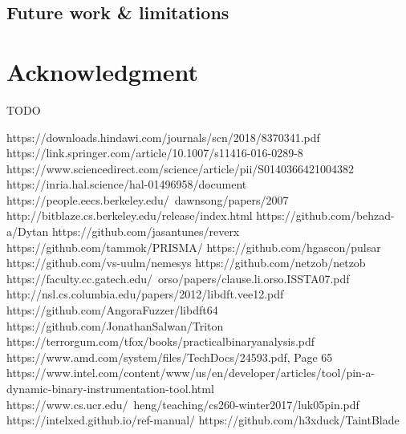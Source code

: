 \documentclass[conference]{IEEEtran}
\begin{document}
\subsection{Future work \& limitations}

\section*{Acknowledgment}
TODO

\begin{thebibliography}{00}
     https://downloads.hindawi.com/journals/scn/2018/8370341.pdf
     https://link.springer.com/article/10.1007/s11416-016-0289-8
     https://www.sciencedirect.com/science/article/pii/S0140366421004382
     https://inria.hal.science/hal-01496958/document
     https://people.eecs.berkeley.edu/~dawnsong/papers/2007%
     http://bitblaze.cs.berkeley.edu/release/index.html
     https://github.com/behzad-a/Dytan
     https://github.com/jasantunes/reverx
     https://github.com/tammok/PRISMA/
     https://github.com/hgascon/pulsar
     https://github.com/vs-uulm/nemesys
     https://github.com/netzob/netzob
     https://faculty.cc.gatech.edu/~orso/papers/clause.li.orso.ISSTA07.pdf
     http://nsl.cs.columbia.edu/papers/2012/libdft.vee12.pdf
     https://github.com/AngoraFuzzer/libdft64
     https://github.com/JonathanSalwan/Triton
     https://terrorgum.com/tfox/books/practicalbinaryanalysis.pdf
     https://www.amd.com/system/files/TechDocs/24593.pdf, Page 65
     https://www.intel.com/content/www/us/en/developer/articles/tool/pin-a-dynamic-binary-instrumentation-tool.html
     https://www.cs.ucr.edu/~heng/teaching/cs260-winter2017/luk05pin.pdf
     https://intelxed.github.io/ref-manual/
     https://github.com/h3xduck/TaintBlade

\end{thebibliography}
\vspace{12pt}
\end{document}
